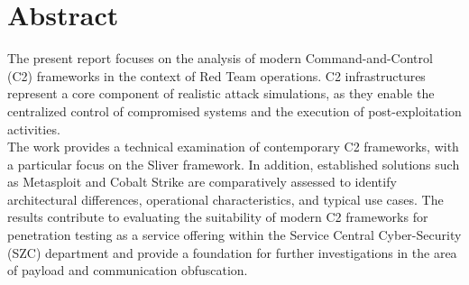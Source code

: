 \section*{Abstract}
The present report focuses on the analysis of modern Command-and-Control (C2) frameworks in the context of Red Team operations. C2 infrastructures represent a core component of realistic attack simulations, as they enable the centralized control of compromised systems and the execution of post-exploitation activities. \\
The work provides a technical examination of contemporary C2 frameworks, with a particular focus on the Sliver framework. In addition, established solutions such as Metasploit and Cobalt Strike are comparatively assessed to identify architectural differences, operational characteristics, and typical use cases. The results contribute to evaluating the suitability of modern C2 frameworks for penetration testing as a service offering within the Service Central Cyber-Security (SZC) department and provide a foundation for further investigations in the area of payload and communication obfuscation.